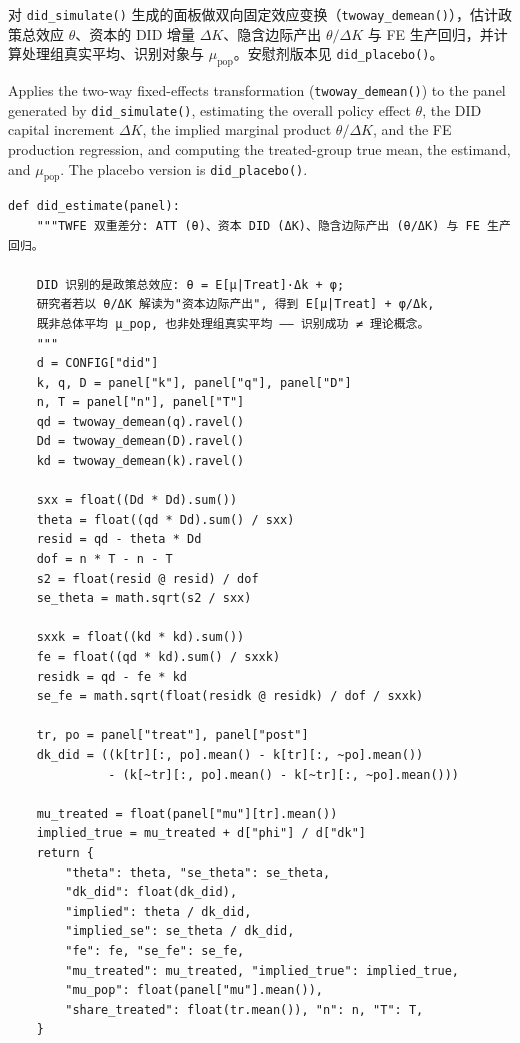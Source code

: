 \documentclass[12pt,a4paper]{ctexart}
\begin{document}
对 \texttt{did\_simulate()} 生成的面板做双向固定效应变换（\texttt{twoway\_demean()}），估计政策总效应 $\theta$、资本的 DID 增量 $\Delta K$、隐含边际产出 $\theta/\Delta K$ 与 FE 生产回归，并计算处理组真实平均、识别对象与 $\mu_{\mathrm{pop}}$。安慰剂版本见 \texttt{did\_placebo()}。

Applies the two-way fixed-effects transformation (\texttt{twoway\_demean()}) to the panel generated by \texttt{did\_simulate()}, estimating the overall policy effect $\theta$, the DID capital increment $\Delta K$, the implied marginal product $\theta/\Delta K$, and the FE production regression, and computing the treated-group true mean, the estimand, and $\mu_{\mathrm{pop}}$. The placebo version is \texttt{did\_placebo()}.

\begin{lstlisting}[style=pycode]
def did_estimate(panel):
    """TWFE 双重差分: ATT (θ)、资本 DID (ΔK)、隐含边际产出 (θ/ΔK) 与 FE 生产回归。

    DID 识别的是政策总效应: θ = E[μ|Treat]·Δk + φ;
    研究者若以 θ/ΔK 解读为"资本边际产出", 得到 E[μ|Treat] + φ/Δk,
    既非总体平均 μ_pop, 也非处理组真实平均 —— 识别成功 ≠ 理论概念。
    """
    d = CONFIG["did"]
    k, q, D = panel["k"], panel["q"], panel["D"]
    n, T = panel["n"], panel["T"]
    qd = twoway_demean(q).ravel()
    Dd = twoway_demean(D).ravel()
    kd = twoway_demean(k).ravel()

    sxx = float((Dd * Dd).sum())
    theta = float((qd * Dd).sum() / sxx)
    resid = qd - theta * Dd
    dof = n * T - n - T
    s2 = float(resid @ resid) / dof
    se_theta = math.sqrt(s2 / sxx)

    sxxk = float((kd * kd).sum())
    fe = float((qd * kd).sum() / sxxk)
    residk = qd - fe * kd
    se_fe = math.sqrt(float(residk @ residk) / dof / sxxk)

    tr, po = panel["treat"], panel["post"]
    dk_did = ((k[tr][:, po].mean() - k[tr][:, ~po].mean())
              - (k[~tr][:, po].mean() - k[~tr][:, ~po].mean()))

    mu_treated = float(panel["mu"][tr].mean())
    implied_true = mu_treated + d["phi"] / d["dk"]
    return {
        "theta": theta, "se_theta": se_theta,
        "dk_did": float(dk_did),
        "implied": theta / dk_did,
        "implied_se": se_theta / dk_did,
        "fe": fe, "se_fe": se_fe,
        "mu_treated": mu_treated, "implied_true": implied_true,
        "mu_pop": float(panel["mu"].mean()),
        "share_treated": float(tr.mean()), "n": n, "T": T,
    }
\end{lstlisting}
\end{document}
